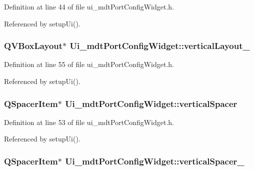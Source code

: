 Definition at line 44 of file ui\-\_\-mdt\-Port\-Config\-Widget.\-h.



Referenced by setup\-Ui().

\hypertarget{class_ui__mdt_port_config_widget_a8a06f16033c31f1bb40d1b6abe4cbba9}{
\subsubsection[{vertical\-Layout\-\_\-2}]{\setlength{\rightskip}{0pt plus 5cm}Q\-V\-Box\-Layout$\ast$ Ui\-\_\-mdt\-Port\-Config\-Widget\-::vertical\-Layout\-\_}}\label{class_ui__mdt_port_config_widget_a8a06f16033c31f1bb40d1b6abe4cbba9}


Definition at line 55 of file ui\-\_\-mdt\-Port\-Config\-Widget.\-h.



Referenced by setup\-Ui().

\hypertarget{class_ui__mdt_port_config_widget_aeb8f037334c9939ddc6b8efb716ec07e}{
\subsubsection[{vertical\-Spacer}]{\setlength{\rightskip}{0pt plus 5cm}Q\-Spacer\-Item$\ast$ Ui\-\_\-mdt\-Port\-Config\-Widget\-::vertical\-Spacer}}\label{class_ui__mdt_port_config_widget_aeb8f037334c9939ddc6b8efb716ec07e}


Definition at line 53 of file ui\-\_\-mdt\-Port\-Config\-Widget.\-h.



Referenced by setup\-Ui().

\hypertarget{class_ui__mdt_port_config_widget_aefe443f81cd551a9b904a999883ab490}{
\subsubsection[{vertical\-Spacer\-\_\-2}]{\setlength{\rightskip}{0pt plus 5cm}Q\-Spacer\-Item$\ast$ Ui\-\_\-mdt\-Port\-Config\-Widget\-::vertical\-Spacer\-\_}}\label{class_ui__mdt_port_config_widget_aefe443f81cd551a9b904a999883ab490}


